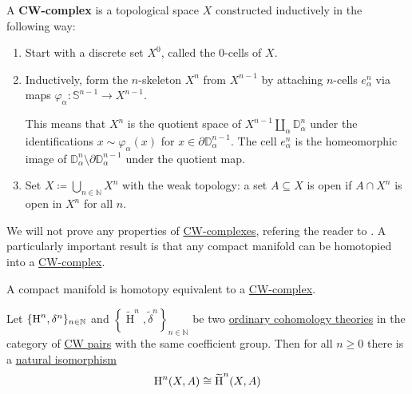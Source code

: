 \documentclass[../../main]{subfiles}
\begin{document}
\begin{definition}[CW-complex]\label{def:CW-complex}
  A \textbf{CW-complex} is a topological space \(X\) constructed inductively in the following way:
  \begin{enumerate}
    \item Start with a discrete set \(X^{0}\), called the 0-cells of \(X\).
    \item Inductively, form the \(n\)-skeleton \(X^{n}\) from \(X^{n-1}\) by attaching \(n\)-cells \(e_{\alpha}^{n}\) via maps \(\varphi_{\alpha}\colon \mathbb{S}^{n-1} \to X^{n-1}\).

          This means that \(X^{n}\) is the quotient space of \(X^{n-1} \coprod_{\alpha} \mathbb{D}_{\alpha}^{n}\) under the identifications \(x \sim \varphi_{\alpha}(x)\) for \(x \in \partial \mathbb{D}_{\alpha}^{n-1}\).
          The cell \(e_{\alpha}^{n}\) is the homeomorphic image of \(\mathbb{D}_{\alpha}^{n} \setminus \partial \mathbb{D}_{\alpha}^{n-1}\) under the quotient map.
    \item Set \(X \coloneq \bigcup_{n \in \mathbb{N}} X^{n}\) with the weak topology: a set \(A \subseteq X\) is open if \(A \cap X^{n}\) is open in \(X^{n}\) for all \(n\).
  \end{enumerate}
\end{definition}

We will not prove any properties of \hyperref[def:CW-complex]{CW-complexes}, refering the reader to \cite[Appendix]{hatcherAlgebraicTopology2002}.
A particularly important result is that any compact manifold can be homotopied into a \hyperref[def:CW-complex]{CW-complex}.
\begin{proposition}\label{prop:manifold-is-CW-complex}
  A compact manifold is homotopy equivalent to a \hyperref[def:CW-complex]{CW-complex}.
\end{proposition}

\begin{theorem}\label{thm:uniqueness-cohomology-theories}
  Let \(\{\operatorname{H}^{n}, \delta^{n}\}_{n \in \mathbb{N}}\) and \(\left\{ \widetilde{\operatorname{H}}^{n}, \widetilde{\delta}^{n} \right\}_{n \in \mathbb{N}}\) be two \hyperref[def:cohomology-theory]{ordinary cohomology theories} in the category of \hyperref[def:CW-complex]{CW pairs} with the same coefficient group.
  Then for all \(n \geq 0\) there is a \hyperref[def:natural-transformation]{natural isomorphism}
  \begin{equation*}
    \operatorname{H}^{n}(X, A) \cong \widetilde{\operatorname{H}}^{n}(X, A)
  \end{equation*}
\end{theorem}
\end{document}
